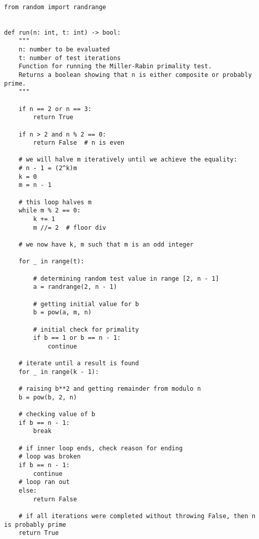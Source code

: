 \documentclass[11pt]{article}
\begin{document}
\lstset{style = MillerRabin}

\begin{lstlisting}

from random import randrange


def run(n: int, t: int) -> bool:
	"""
	n: number to be evaluated
	t: number of test iterations
	Function for running the Miller-Rabin primality test.
	Returns a boolean showing that n is either composite or probably prime.
	"""

	if n == 2 or n == 3:
		return True

	if n > 2 and n % 2 == 0:
		return False  # n is even
	
	# we will halve m iteratively until we achieve the equality:
	# n - 1 = (2^k)m
	k = 0
	m = n - 1
	
	# this loop halves m
	while m % 2 == 0:
		k += 1
		m //= 2  # floor div

	# we now have k, m such that m is an odd integer

	for _ in range(t):

		# determining random test value in range [2, n - 1]
		a = randrange(2, n - 1)
		
		# getting initial value for b
		b = pow(a, m, n)

		# initial check for primality
		if b == 1 or b == n - 1:
			continue

	# iterate until a result is found
	for _ in range(k - 1):

	# raising b**2 and getting remainder from modulo n
	b = pow(b, 2, n)
	
	# checking value of b
	if b == n - 1:
		break

	# if inner loop ends, check reason for ending
	# loop was broken
	if b == n - 1:
		continue
	# loop ran out
	else:
		return False

	# if all iterations were completed without throwing False, then n is probably prime
	return True

\end{lstlisting}

\newpage

\lstset{style = ChebyshevTheta}
\end{document}
